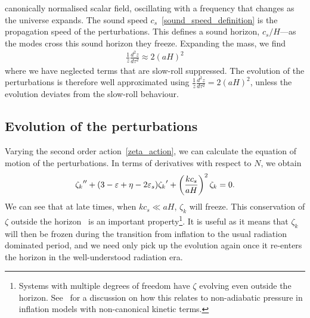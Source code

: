     canonically normalised scalar field, oscillating
    with a frequency that changes as the universe expands.
    The sound speed $c_s$~\eqref{sound_speed_definition} is
    the propagation speed of the perturbations.
    This defines a sound horizon, $c_s/H$---as the modes cross this sound
    horizon they freeze.
    Expanding the mass, we find
    \begin{align}
        \frac{1}{z}\frac{d^2z}{d\tau^2} \approx 2{\left(aH\right)}^2
    \end{align}
    where we have neglected terms that are slow-roll suppressed.
    The evolution of the perturbations is therefore well approximated using
    $\frac{1}{z}\frac{d^2z}{d\tau^2} = 2{\left(aH\right)}^2$,
    unless the evolution deviates from the slow-roll behaviour.

    \subsection{Evolution of the perturbations}\label{pert_evol}
    Varying the second order action~\eqref{zeta_action}, we can calculate the equation of motion
    of the perturbations.
    In terms of derivatives with respect to $N$, we obtain
    \begin{align}\label{modefneqn_zeta_N}
        {\zeta_k}'' + (3-\varepsilon+\eta-2\varepsilon_{s}){\zeta_k}'+\left(\frac{kc_s}{aH}\right)^2\zeta_k=0.
    \end{align}
    We can see that at late times, when $kc_s\ll aH$, $\zeta_k$ will freeze.
    This conservation of $\zeta$ outside the horizon~\cite{Lyth_conserved} is an
    important property\footnote{
    Systems with multiple degrees of freedom have $\zeta$ evolving even outside
    the horizon. See~\cite{Christopherson_2009} for a discussion on how this relates
    to non-adiabatic pressure in inflation models with non-canonical kinetic terms.}.
    It is useful as it means that $\zeta_k$ will then be frozen during the transition from inflation to the
    usual radiation dominated period, and we need only pick up the evolution again once it
    re-enters the horizon in the well-understood radiation era.


